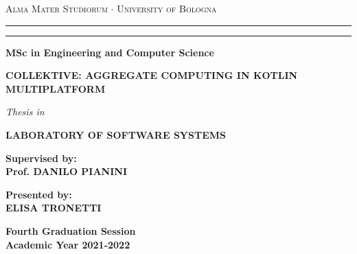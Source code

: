 \begin{titlepage}
    \begin{center}
    {{\Large{
        \textsc{Alma Mater Studiorum $\cdot$ University of Bologna}
    }}}
    \rule[0.1cm]{15.8cm}{0.1mm}
    \rule[0.5cm]{15.8cm}{0.6mm}
    {\small{\bf MSc in Engineering and Computer Science}}
    \vspace{41mm} %
    \end{center}
    \begin{center}
        \huge\bf COLLEKTIVE: AGGREGATE COMPUTING IN KOTLIN MULTIPLATFORM
    \end{center}
    \vspace{41mm} %
    \begin{center}
    {{\emph{Thesis in}}}
    
    \vspace{1mm}
    {{\bf{LABORATORY OF SOFTWARE SYSTEMS}}}
    \vspace{18mm}
    \end{center}
    \par
    \noindent
    \begin{minipage}[t]{0.47\textwidth}
    {\large{\bf Supervised by:\\
    Prof. DANILO PIANINI}}
    \end{minipage}
    \hfill
    \begin{minipage}[t]{0.47\textwidth}\raggedleft
    {\large{\bf Presented by:\\
    ELISA TRONETTI}}
    \end{minipage}
    \vspace{20mm}
    \begin{center}
    {\large{\bf Fourth Graduation Session\\
    Academic Year 2021-2022}}
    \end{center}
\end{titlepage}
